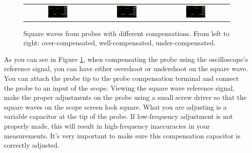 \documentclass[12pt]{../manual}
\begin{document}
\begin{appendices}
\begin{figure}[ht!]
\begin{center}
\begin{tabular}{ccc}
\includegraphics[width=0.31\textwidth]{figures/overcomp.png} & \includegraphics[width=0.31\textwidth]{figures/wellcomp.png} & 
\includegraphics[width=0.31\textwidth]{figures/undercomp.png}
\end{tabular}
\end{center}
\caption[Square waves from probes with different compensations]{Square waves from probes with different compensations. From left to right: over-compensated, well-compensated, under-compensated.}
\label{fig:oscdifcomp}
\end{figure}

As you can see in Figure \ref{fig:oscdifcomp}, when compensating the probe using the oscilloscope's reference signal, you can have either overshoot or undershoot on the square wave. You can attach the probe tip to the probe compensation terminal and connect the probe to an input of the scope. Viewing the square wave reference signal, make the proper adjustments on the probe using a small screw driver so that the square waves on the scope screen look square. What you are adjusting is a variable capacitor at the tip of the probe. If low-frequency adjustment is not properly made, this will result in high-frequency inaccuracies in your measurements.  It's very important to make sure this compensation capacitor is correctly adjusted.
\end{appendices}
\end{document}
